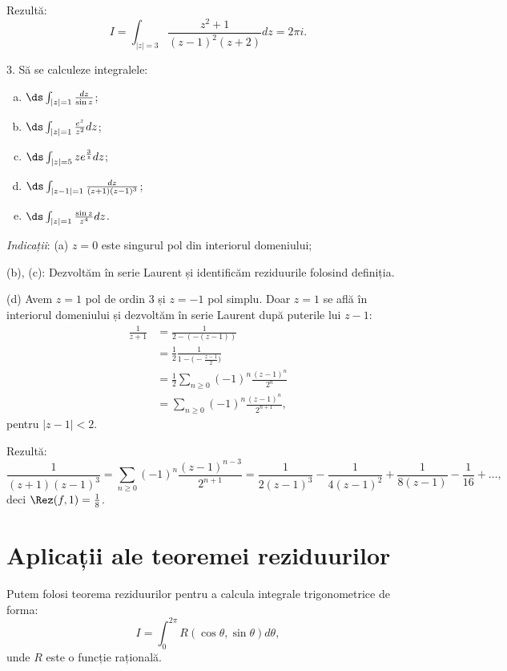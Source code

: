 Rezultă:
\[
  I = \int_{|z| = 3} \frac{z^2 + 1}{(z - 1)^2(z + 2)} dz = 2 \pi i.
\]

\vspace{1cm}

3. Să se calculeze integralele:
\begin{enumerate}[(a)]
\item $ \ds\int_{|z| = 1} \frac{dz}{\sin z} $;
\item $ \ds\int_{|z| = 1} \frac{e^z}{z^2}dz $;
\item $ \ds\int_{|z| = 5} z e^{\frac{3}{z}} dz $;
\item $ \ds\int_{|z - 1| = 1} \frac{dz}{(z + 1)(z - 1)^3} $;
\item $ \ds\int_{|z| = 1} \frac{\sin z}{z^4} dz $.
\end{enumerate}

\emph{Indicații}: (a) $ z = 0 $ este singurul pol din interiorul domeniului;

(b), (c): Dezvoltăm în serie Laurent și identificăm reziduurile folosind definiția.

(d) Avem $ z = 1 $ pol de ordin 3 și $ z = -1 $ pol simplu. Doar $ z = 1 $ se află
în interiorul domeniului și dezvoltăm în serie Laurent după puterile lui $ z - 1 $:
\begin{align*}
  \frac{1}{z + 1} &= \frac{1}{2 - (-(z - 1))} \\
                  &= \frac{1}{2} \frac{1}{1 - \big(-\frac{z - 1}{2}\big)} \\
                  &= \frac{1}{2} \sum_{n \geq 0} (-1)^n \frac{(z - 1)^n}{2^n} \\
                  &= \sum_{n \geq 0} (-1)^n \frac{(z - 1)^n}{2^{n+1}},
\end{align*}
pentru $ |z - 1| < 2 $.

Rezultă:
\[
  \frac{1}{(z + 1)(z - 1)^3} = \sum_{n \geq 0} (-1)^n \frac{(z - 1)^{n-3}}{2^{n+1}} = %
  \frac{1}{2(z - 1)^3} - \frac{1}{4(z - 1)^2} + \frac{1}{8(z - 1)} - \frac{1}{16} + \dots,
\]
deci $ \Rez(f, 1) = \frac{1}{8} $.


\section{Aplicații ale teoremei reziduurilor}

\indent\indent Putem folosi teorema reziduurilor pentru a calcula integrale trigonometrice de forma:
\[
  I = \int_0^{2 \pi} R(\cos \theta, \sin \theta) d \theta,
\]
unde $ R $ este o funcție rațională.


